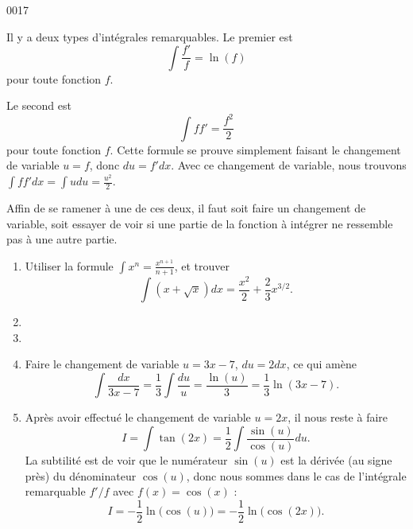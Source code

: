 \begin{corrige}{0017}

Il y a deux types d'intégrales remarquables. Le premier est
\begin{equation}
	\int\frac{ f' }{ f }=\ln(f)
\end{equation}
pour toute fonction $f$.

Le second est
\begin{equation}
	\int ff'=\frac{ f^2 }{2}
\end{equation}
pour toute fonction $f$. Cette formule se prouve simplement faisant le changement de variable $u=f$, donc $du=f'dx$. Avec ce changement de variable, nous trouvons $\int ff'dx=\int udu=\frac{ u^2 }{2}$.

Affin de se ramener à une de ces deux, il faut soit faire un changement de variable, soit essayer de voir si une partie de la fonction à intégrer ne ressemble pas à une autre partie.

\renewcommand{\theenumi}{\arabic{enumi}}
\begin{enumerate}

\item
Utiliser la formule $\int x^n=\frac{ x^{n+1} }{ n+1 }$, et trouver
\begin{equation}
	\int(x+\sqrt{x})dx=\frac{ x^2 }{ 2 }+\frac{ 2 }{ 3 }x^{3/2}.
\end{equation}

\item
\item

\item
Faire le changement de variable $u=3x-7$, $du=2dx$, ce qui amène
\begin{equation}
	\int \frac{dx}{ 3x-7 }=\frac{1}{ 3 }\int \frac{ du }{ u }=\frac{ \ln(u) }{ 3 }=\frac{1}{ 3 }\ln(3x-7).
\end{equation}

\item\label{ItemIntCinq}
Après avoir effectué le changement de variable $u=2x$, il nous reste à faire
\begin{equation}
	I=\int\tan(2x)=\frac{1}{ 2 }\int\frac{ \sin(u) }{ \cos(u) }du.
\end{equation}
La subtilité est de voir que le numérateur $\sin(u)$ est la dérivée (au signe près) du dénominateur $\cos(u)$, donc nous sommes dans le cas de l'intégrale remarquable $f'/f$ avec $f(x)=\cos(x)$ :
\begin{equation}
	I=-\frac{ 1 }{2}\ln\big( \cos(u) \big)=-\frac{ 1 }{2}\ln\big( \cos(2x) \big).
\end{equation}


\end{enumerate}
\end{corrige}

